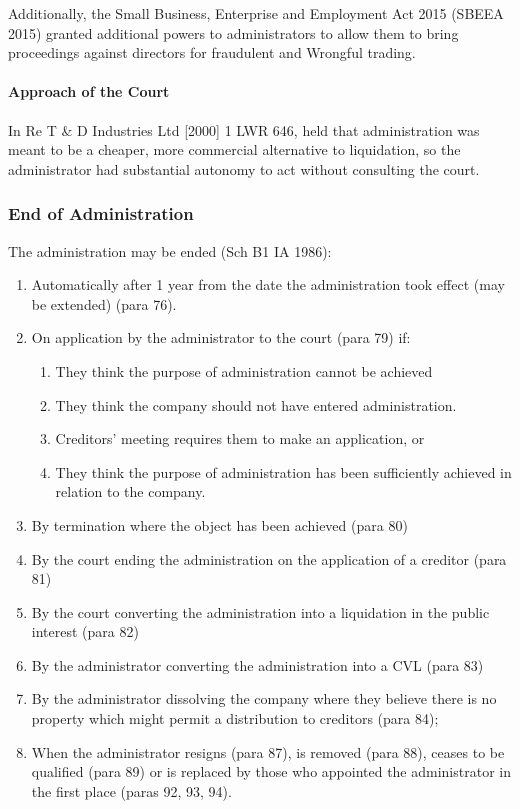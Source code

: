\documentclass[
]{article}
\providecommand{\tightlist}{%
  \setlength{\itemsep}{0pt}\setlength{\parskip}{0pt}}
\begin{document}
Additionally, the Small Business, Enterprise and Employment Act 2015
(SBEEA 2015) granted additional powers to administrators to allow them
to bring proceedings against directors for fraudulent and Wrongful
trading.

\hypertarget{approach-of-the-court}{%
\paragraph{Approach of the Court}\label{approach-of-the-court}}

In Re T \& D Industries Ltd {[}2000{]} 1 LWR 646, held that
administration was meant to be a cheaper, more commercial alternative to
liquidation, so the administrator had substantial autonomy to act
without consulting the court.

\hypertarget{end-of-administration}{%
\subsubsection{End of Administration}\label{end-of-administration}}

The administration may be ended (Sch B1 IA 1986):

\begin{enumerate}
\tightlist
\item
  Automatically after 1 year from the date the administration took
  effect (may be extended) (para 76).
\item
  On application by the administrator to the court (para 79) if:

  \begin{enumerate}
  \tightlist
  \item
    They think the purpose of administration cannot be achieved
  \item
    They think the company should not have entered administration.
  \item
    Creditors' meeting requires them to make an application, or
  \item
    They think the purpose of administration has been sufficiently
    achieved in relation to the company.
  \end{enumerate}
\item
  By termination where the object has been achieved (para 80)
\item
  By the court ending the administration on the application of a
  creditor (para 81)
\item
  By the court converting the administration into a liquidation in the
  public interest (para 82)
\item
  By the administrator converting the administration into a CVL (para
  83)
\item
  By the administrator dissolving the company where they believe there
  is no property which might permit a distribution to creditors (para
  84);
\item
  When the administrator resigns (para 87), is removed (para 88), ceases
  to be qualified (para 89) or is replaced by those who appointed the
  administrator in the first place (paras 92, 93, 94).
\end{enumerate}
\end{document}
